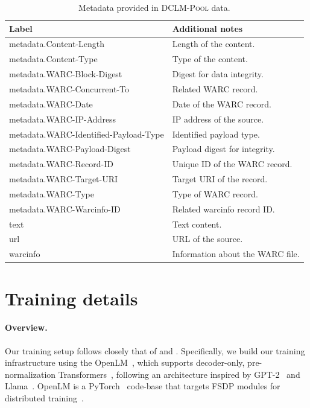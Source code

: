 \documentclass{article}
\newcommand{\rawpool}{\textsc{DCLM-Pool}\xspace}
\begin{document}
\begin{table}[h]
    \centering
    \caption{Metadata provided in \rawpool data.}
    \label{tab:raw_pool_meta}
\begingroup
\renewcommand{\arraystretch}{1.3}
    \begin{tabular}{ll}
        \toprule
        Label & Additional notes
        \\
        \midrule
         metadata.Content-Length & Length of the content. \\
        metadata.Content-Type & Type of the content. \\ \midrule
        metadata.WARC-Block-Digest & Digest for data integrity. \\
         metadata.WARC-Concurrent-To & Related WARC record. \\
         metadata.WARC-Date & Date of the WARC record. \\
        metadata.WARC-IP-Address & IP address of the source. \\
         metadata.WARC-Identified-Payload-Type & Identified payload type. \\
        metadata.WARC-Payload-Digest & Payload digest for integrity. \\
        metadata.WARC-Record-ID & Unique ID of the WARC record. \\
         metadata.WARC-Target-URI & Target URI of the record. \\
         metadata.WARC-Type & Type of WARC record. \\
         metadata.WARC-Warcinfo-ID & Related warcinfo record ID. \\ \midrule
         text & Text content. \\
         url & URL of the source. \\
       warcinfo & Information about the WARC file.
       \\
       \bottomrule
    \end{tabular}
    \endgroup

\end{table}


\section{Training details}
\label{appx:training}

\paragraph{Overview.}
Our training setup follows closely that of \citet{wortsman2023small} and \citet{gadre2024LanguageMS}.
Specifically, we build our training infrastructure using the OpenLM~\citep{open_lm}, which supports decoder-only, pre-normalization Transformers~\citep{transformer}, following an architecture inspired by GPT-2~\citep{Radford2019LanguageMA} and Llama~\citep{llama}.
OpenLM is a PyTorch~\citep{paszke2019pytorch,pytorch2} code-base that targets FSDP modules for distributed training~\citep{Zhao2023PyTorchFE}.
\end{document}
